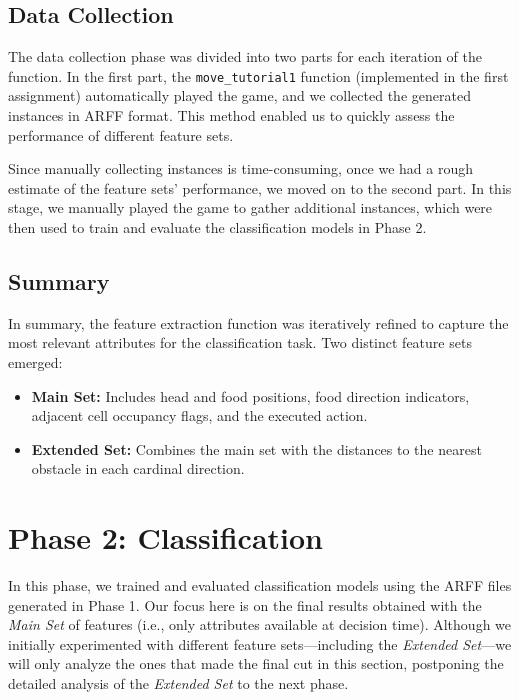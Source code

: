 \documentclass[12pt,a4paper]{article}
\begin{document}
\subsection{Data Collection}

The data collection phase was divided into two parts for each iteration of the function. In the first part, the \texttt{move\_tutorial1} function (implemented in the first assignment) automatically played the game, and we collected the generated instances in ARFF format. This method enabled us to quickly assess the performance of different feature sets.

Since manually collecting instances is time-consuming, once we had a rough estimate of the feature sets' performance, we moved on to the second part. In this stage, we manually played the game to gather additional instances, which were then used to train and evaluate the classification models in Phase 2.

\subsection{Summary}

In summary, the feature extraction function was iteratively refined to capture the most relevant attributes for the classification task. Two distinct feature sets emerged:

\begin{itemize}
    \item \textbf{Main Set:} Includes head and food positions, food direction indicators, adjacent cell occupancy flags, and the executed action.
    \item \textbf{Extended Set:} Combines the main set with the distances to the nearest obstacle in each cardinal direction.
\end{itemize}


\newpage
\section{Phase 2: Classification}

In this phase, we trained and evaluated classification models using the ARFF files generated in Phase 1. Our focus here is on the final results obtained with the \textit{Main Set} of features (i.e., only attributes available at decision time). Although we initially experimented with different feature sets—including the \textit{Extended Set}—we will only analyze the ones that made the final cut in this section, postponing the detailed analysis of the \textit{Extended Set} to the next phase.
\end{document}
